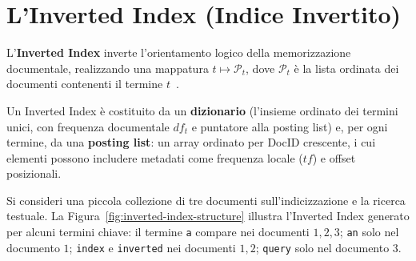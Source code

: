 \FloatBarrier
\section{L'Inverted Index (Indice Invertito)}
\label{sec:inverted-index-fondamenti}

L'\textbf{Inverted Index} inverte l'orientamento logico della memorizzazione documentale, realizzando una mappatura $t \mapsto \mathcal{P}_t$, dove $\mathcal{P}_t$ \`e la lista ordinata dei documenti contenenti il termine $t$~\cite{manning2008}.

\begin{definition}
Un Inverted Index \`e costituito da un \textbf{dizionario} (l'insieme ordinato dei termini unici, con frequenza documentale $df_t$ e puntatore alla posting list) e, per ogni termine, da una \textbf{posting list}: un array ordinato per DocID crescente, i cui elementi possono includere metadati come frequenza locale ($tf$) e offset posizionali.
\end{definition}

\begin{example}
Si consideri una piccola collezione di tre documenti sull'indicizzazione e la ricerca testuale. La Figura~\ref{fig:inverted-index-structure} illustra l'Inverted Index generato per alcuni termini chiave: il termine \texttt{a} compare nei documenti $1,2,3$; \texttt{an} solo nel documento $1$; \texttt{index} e \texttt{inverted} nei documenti $1,2$; \texttt{query} solo nel documento $3$.
\end{example}

